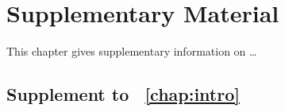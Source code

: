 \chapter{Supplementary Material}
\label{chap:supp}

\mbox{}
\vfill  
This chapter gives supplementary information on \ldots
\clearpage
\section{Supplement to \chap\ \ref{chap:intro}}
\label{sec:chap1supp}

\afterpage{\blankpage}
